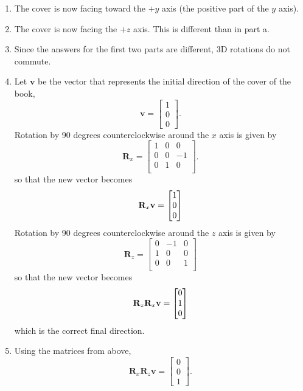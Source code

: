 \begin{sol}
\begin{enumerate}
    \item The cover is now facing toward the $+y$ axis (the positive part of the $y$ axis).
    \item The cover is now facing the $+z$ axis. This is different than in part a.
    \item Since the answers for the first two parts are different, 3D rotations do not commute.
    \item Let $\mathbf{v}$ be the vector that represents the initial direction of the cover of the book,
    $$\mathbf{v} = \begin{bmatrix}
    1 \\ 0 \\ 0
    \end{bmatrix}.$$
    Rotation by 90 degrees counterclockwise around the $x$ axis is given by
    $$\mathbf{R}_x = \begin{bmatrix}
    1 & 0 & 0 \\
    0 & 0 &  -1 \\[3pt]
    0 & 1  &  0 \\[3pt]
    \end{bmatrix}.$$
    so that the new vector becomes 
    $$\mathbf{R}_x \mathbf{v} = \begin{bmatrix} 1 \\ 0 \\ 0 \end{bmatrix}$$
    Rotation by 90 degrees counterclockwise around the $z$ axis is given by
    $$\mathbf{R}_z = \begin{bmatrix}
    0 &  -1 & 0 \\[3pt]
    1 &   0 & 0\\[3pt]
    0 & 0 & 1\\
    \end{bmatrix}$$
    so that the new vector becomes
    $$\mathbf{R}_z \mathbf{R}_x \mathbf{v} = \begin{bmatrix} 0 \\ 1 \\ 0 \end{bmatrix}$$
    which is the correct final direction.
    
    \item Using the matrices from above,
    $$\mathbf{R}_x\mathbf{R}_z\mathbf{v} = \begin{bmatrix}
    0 \\ 0 \\ 1
    \end{bmatrix}.$$
    

\end{enumerate}
\end{sol}
